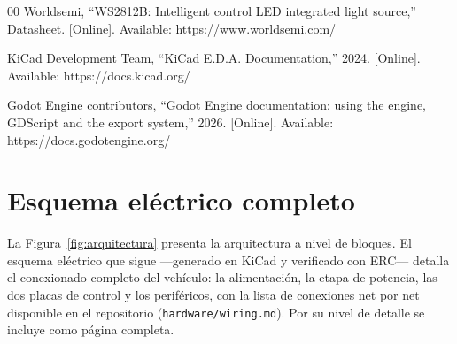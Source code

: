 \documentclass[journal]{IEEEtran}
\begin{document}
\begin{thebibliography}{00}
 Worldsemi, ``WS2812B: Intelligent control LED integrated light source,'' Datasheet. [Online]. Available: https://www.worldsemi.com/

 KiCad Development Team, ``KiCad E.D.A. Documentation,'' 2024. [Online]. Available: https://docs.kicad.org/

 Godot Engine contributors, ``Godot Engine documentation: using the engine, GDScript and the export system,'' 2026. [Online]. Available: https://docs.godotengine.org/

\end{thebibliography}

\appendices
\section{Esquema eléctrico completo}

La Figura~\ref{fig:arquitectura} presenta la arquitectura a nivel de bloques. El esquema
eléctrico que sigue ---generado en KiCad y verificado con ERC--- detalla el conexionado
completo del vehículo: la alimentación, la etapa de potencia, las dos placas de control y
los periféricos, con la lista de conexiones net por net disponible en el repositorio
(\texttt{hardware/wiring.md}). Por su nivel de detalle se incluye como página completa.



\end{document}
